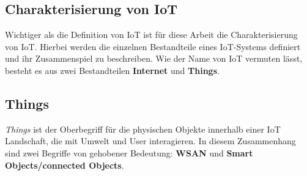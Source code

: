 \subsection{Charakterisierung von IoT}\label{subsec:characIot}
Wichtiger als die Definition von \ac{IoT} ist für diese Arbeit die Charakterisierung von \ac{IoT}. Hierbei werden die einzelnen Bestandteile eines \ac{IoT}-Systems definiert und ihr Zusammenspiel zu beschreiben. Wie der Name von \acl{IoT} vermuten lässt, besteht es aus zwei Bestandteilen \textbf{Internet} und \textbf{Things}.

\subsection{Things}
\textit{Things} ist der Oberbegriff für die physischen Objekte innerhalb einer \ac{IoT} Landschaft, die mit Umwelt und User interagieren. In diesem Zusammenhang sind zwei Begriffe von gehobener Bedeutung: \textbf{\ac{WSAN}} und \textbf{Smart Objects/connected Objects}.

